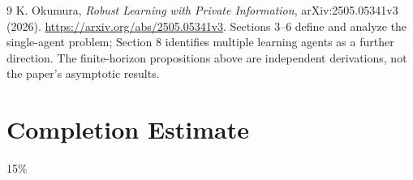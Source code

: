 \documentclass[11pt]{article}
\theoremstyle{definition}
\theoremstyle{remark}
\begin{document}
\begin{thebibliography}{9}
 K. Okumura, \emph{Robust Learning with Private Information}, arXiv:2505.05341v3 (2026). \url{https://arxiv.org/abs/2505.05341v3}. Sections 3--6 define and analyze the single-agent problem; Section 8 identifies multiple learning agents as a further direction. The finite-horizon propositions above are independent derivations, not the paper's asymptotic results.
\end{thebibliography}
\section{Completion Estimate}
15\%
\end{document}
